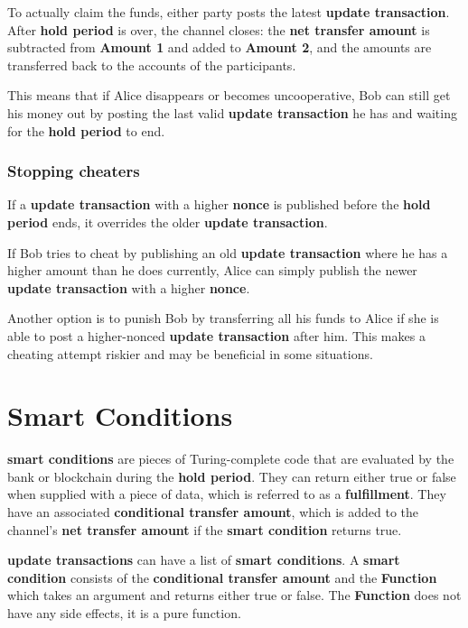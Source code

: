 \documentclass[a4paper]{article}
\newcommand{\bgls}[1]{\textbf{\gls{#1}}}
\newcommand{\bglspl}[1]{\textbf{\glspl{#1}}}
\begin{document}
To actually claim the funds, either party posts the latest \bgls{update transaction}. After \bgls{hold period} is over, the channel closes: the \bgls{net transfer amount} is subtracted from \textbf{Amount 1} and added to \textbf{Amount 2}, and the amounts are transferred back to the accounts of the participants.

This means that if Alice disappears or becomes uncooperative, Bob can still get his money out by posting the last valid \bgls{update transaction} he has and waiting for the \bgls{hold period} to end.

\subsubsection{Stopping cheaters}

If a \bgls{update transaction} with a higher \bgls{nonce} is published before the \bgls{hold period} ends, it overrides the older \bgls{update transaction}.

If Bob tries to cheat by publishing an old \bgls{update transaction} where he has a higher amount than he does currently, Alice can simply publish the newer \bgls{update transaction} with a higher \bgls{nonce}.

Another option is to punish Bob by transferring all his funds to Alice if she is able to post a higher-nonced \bgls{update transaction} after him. This makes a cheating attempt riskier and may be beneficial in some situations.

\section{Smart Conditions}

\bglspl{smart condition} are pieces of Turing-complete code that are evaluated by the bank or blockchain during the \bgls{hold period}. They can return either true or false when supplied with a piece of data, which is referred to as a \bgls{fulfillment}. They have an associated \bgls{conditional transfer amount}, which is added to the channel's \bgls{net transfer amount} if the \bgls{smart condition} returns true.

\bglspl{update transaction} can have a list of \bglspl{smart condition}. A \bgls{smart condition} consists of the \bgls{conditional transfer amount} and the \textbf{Function} which takes an argument and returns either true or false. The \textbf{Function} does not have any side effects, it is a pure function.
\end{document}

